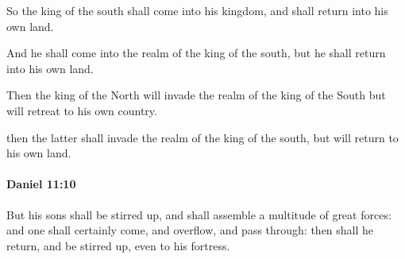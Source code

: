 			So the king of the south shall come into his kingdom, and shall return into his own land.

			\begin{versebox}
					\item[BHS] 
					\item[LXX] 
					\item[ASV] And he shall come into the realm of the king of the south, but he shall return into his own land.
					\item[NIV] Then the king of the North will invade the realm of the king of the South but will retreat to his own country.
					\item[NRSV] then the latter shall invade the realm of the king of the south, but will return to his own land.
			\end{versebox}

		\paragraph{Daniel 11:10} %
			\label{DANIEL-11-10}

			But his sons shall be stirred up, and shall assemble a multitude of great forces: and one shall certainly come, and overflow, and pass through: then shall he return, and be stirred up, even to his fortress.

